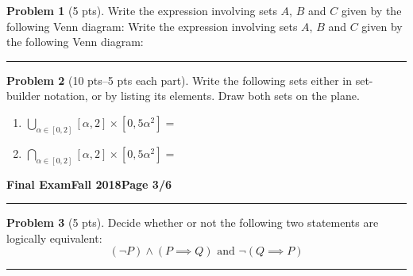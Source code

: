 \documentclass[11pt]{article}
\theoremstyle{definition}
\newtheorem{problem}{Problem}
\theoremstyle{theorem}
\begin{document}
\begin{problem}[5 pts]\label{venn}
  Write the expression involving sets $A$, $B$ and $C$ given by the following Venn diagram:
  Write the expression involving sets $A$, $B$ and $C$ given by the following Venn diagram:
  \begin{center}
  \end{center}

  \vspace{1cm}
\end{problem}
\hrule

\begin{problem}[10 pts--5 pts each part]
  Write the following sets either in set-builder notation, or by listing its elements.  Draw both sets on the plane.
  \begin{enumerate}
  \item $\displaystyle{\bigcup_{\alpha \in [0,2]}[\alpha,2] \times [0,5\alpha^2]=}$
  \item $\displaystyle{\bigcap_{\alpha \in [0,2]}[\alpha,2] \times [0,5\alpha^2]=}$
  \end{enumerate}
\end{problem}

\newpage

\hfill{\large\bf Final Exam}\hfill{\large\bf Fall 2018}\hfill{\large\bf Page 3/6}\hrule

\bigskip

\begin{problem}[5 pts]
  Decide whether or not the following two statements are logically equivalent:
  \begin{equation*}
    (\lnot P) \land (P \implies Q) \text{ and } \lnot ( Q \implies P)
  \end{equation*}

  \vspace{2cm}
\end{problem}
\hrule
\end{document}
